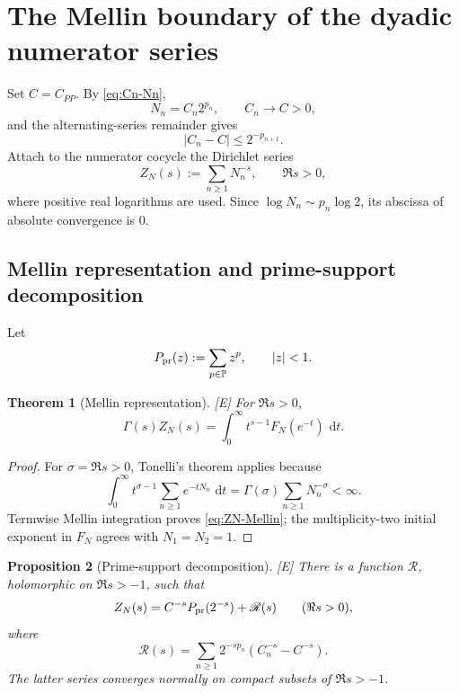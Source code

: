 \documentclass[11pt]{article}
\newtheorem{theorem}{Theorem}[section]
\newtheorem{proposition}[theorem]{Proposition}
\theoremstyle{definition}
\theoremstyle{remark}
\newcommand{\PP}{\mathbb P}
\newcommand{\status}[1]{\textnormal{\textcolor{accent}{\footnotesize[#1]}}}
\newcommand{\dd}{\,\mathrm d}
\begin{document}
\section{The Mellin boundary of the dyadic numerator series}
\label{sec:ZN-boundary}

Set $C=C_{PP}$.  By \eqref{eq:Cn-Nn},
\[
 N_n=C_n2^{p_n},\qquad C_n\longrightarrow C>0,
\]
and the alternating-series remainder gives
\begin{equation}\label{eq:Cn-tail}
 |C_n-C|\le2^{-p_{n+1}}.
\end{equation}
Attach to the numerator cocycle the Dirichlet series
\begin{equation}\label{eq:ZN-def}
 Z_N(s):=\sum_{n\ge1}N_n^{-s},\qquad \Re s>0,
\end{equation}
where positive real logarithms are used.  Since $\log N_n\sim p_n\log2$, its
abscissa of absolute convergence is $0$.

\subsection{Mellin representation and prime-support decomposition}

Let
\begin{equation}\label{eq:prime-support-series}
 P_{\rm pr}(z):=\sum_{p\in\PP}z^p,\qquad |z|<1.
\end{equation}

\begin{theorem}[Mellin representation]\label{thm:ZN-Mellin}
\status{E}
For $\Re s>0$,
\begin{equation}\label{eq:ZN-Mellin}
 \Gamma(s)Z_N(s)=\int_0^\infty t^{s-1}F_N(e^{-t})\,\dd t.
\end{equation}
\end{theorem}

\begin{proof}
For $\sigma=\Re s>0$, Tonelli's theorem applies because
\[
 \int_0^\infty t^{\sigma-1}\sum_{n\ge1}e^{-tN_n}\,\dd t
 =\Gamma(\sigma)\sum_{n\ge1}N_n^{-\sigma}<\infty.
\]
Termwise Mellin integration proves \eqref{eq:ZN-Mellin}; the multiplicity-two initial
exponent in $F_N$ agrees with $N_1=N_2=1$.
\end{proof}

\begin{proposition}[Prime-support decomposition]\label{prop:ZN-decomposition}
\status{E}
There is a function $\mathscr R$, holomorphic on $\Re s>-1$, such that
\begin{equation}\label{eq:ZN-decomposition}
 Z_N(s)=C^{-s}P_{\rm pr}(2^{-s})+\mathscr R(s)\qquad(\Re s>0),
\end{equation}
where
\begin{equation}\label{eq:ZN-R}
 \mathscr R(s)=\sum_{n\ge1}2^{-sp_n}(C_n^{-s}-C^{-s}).
\end{equation}
The latter series converges normally on compact subsets of $\Re s>-1$.
\end{proposition}
\end{document}
